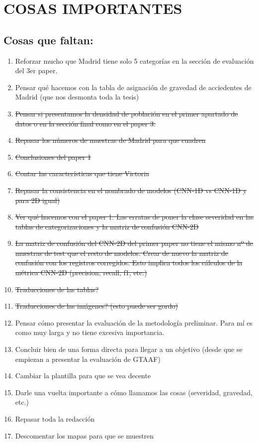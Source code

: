 \documentclass{uathesis-es}
\begin{document}
{\chapter{COSAS IMPORTANTES}

\section{Cosas que faltan:}
\begin{enumerate}
	\item Reforzar mucho que Madrid tiene solo 5 categorías en la sección de evaluación del 3er paper.
	\item Pensar qué hacemos con la tabla de asignación de gravedad de acciedentes de Madrid (que nos desmonta toda la tesis)
	\item \sout{Pensar si presentamos la densidad de población en el primer apartado de datos o en la sección final como en el paper 3.}
	\item \sout{Repasar los números de muestras de Madrid para que cuadren}
	\item \sout{Conclusiones del paper 1}
	\item \sout{Contar las características que tiene Victoria}
	\item \sout{Repasar la consistencia en el nombrado de modelos (CNN-1D vs CNN-1D y para 2D igual)}
	\item \sout{Ver qué hacemos con el paper 1. Las erratas de poner la clase severidad en las tablas de categorizaciones y la matriz de confusión CNN-2D}
	\item \sout{La matriz de confusión del CNN-2D del primer paper no tiene el mismo nº de muestras de test que el resto de modelos. Crear de nuevo la matriz de confusión con los registros corregidos. Esto implica todos los cálculos de la métrica CNN-2D (precision, recall, f1, etc.)}
	\item \sout{Traducciones de las tablas?}
	\item \sout{Traducciones de las imágenes? (esto puede ser gordo)}
	\item Pensar cómo presentar la evaluación de la metodología preliminar. Para mí es como muy larga y no tiene excesiva importancia.
	\item Concluir bien de una forma directa para llegar a un objetivo (desde que se empiezan a presentar la evaluación de GTAAF)
	\item Cambiar la plantilla para que se vea decente
	\item Darle una vuelta importante a cómo llamamos las cosas (severidad, gravedad, etc.)
	\item Repasar toda la redacción
	\item Descomentar los mapas para que se muestren
\end{enumerate}

}
\end{document}
